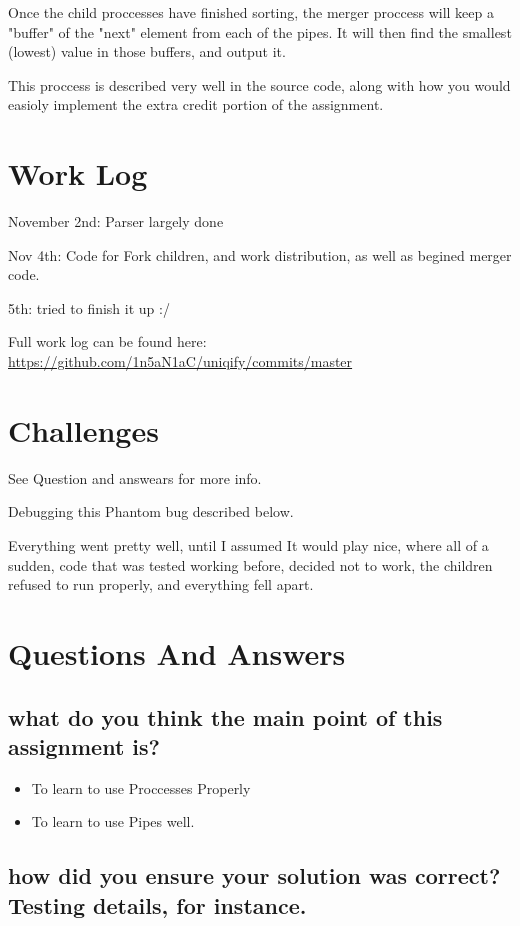 \documentclass[letterpaper,10pt,titlepage]{article}
\begin{document}
Once the child proccesses have finished sorting, the merger proccess will keep a "buffer" of the "next" element from each of the pipes.  It will then find the smallest (lowest) value in those buffers, and output it.

This proccess is described very well in the source code, along with how you would easioly implement the extra credit portion of the assignment.

\section{Work Log}

November 2nd: Parser largely done

Nov 4th: Code for Fork children, and work distribution, as well as begined merger code.

5th: tried to finish it up :/

Full work log can be found here:
\url{https://github.com/1n5aN1aC/uniqify/commits/master}

\section{Challenges}

See Question and answears for more info.

Debugging this Phantom bug described below.

Everything went pretty well, until I assumed It would play nice, where all of a sudden, code that was tested working before, decided not to work, the children refused to run properly, and everything fell apart.

\section{Questions And Answers}

\subsection{what do you think the main point of this assignment is?}

\begin{itemize}
\item To learn to use Proccesses Properly
\item To learn to use Pipes well.
\end{itemize}

\subsection{how did you ensure your solution was correct? Testing details, for instance.}
\end{document}
